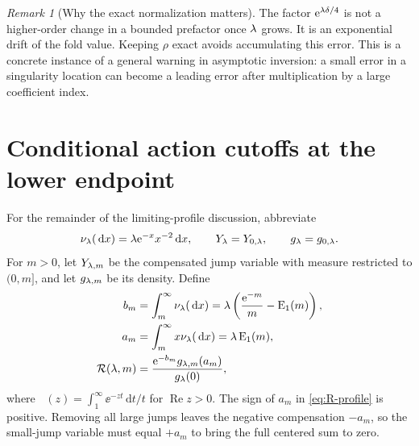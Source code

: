 \documentclass[11pt,a4paper]{article}
\numberwithin{equation}{section}
\theoremstyle{definition}
\theoremstyle{remark}
\newtheorem{remark}[theorem]{Remark}
\DeclareMathOperator{\Rea}{Re}
\DeclareMathOperator{\Eone}{E_1}
\newcommand{\dd}{\,\mathrm d}\newcommand{\ii}{\mathrm i}
\begin{document}
\begin{remark}[Why the exact normalization matters]
The factor \(\mathrm e^{\lambda\delta/4}\) is not a higher-order change in a bounded
prefactor once \(\lambda\) grows. It is an exponential drift of the fold
value. Keeping \(\rho\) exact avoids accumulating this error. This is a
concrete instance of a general warning in asymptotic inversion: a small
error in a singularity location can become a leading error after
multiplication by a large coefficient index.
\end{remark}

\section{Conditional action cutoffs at the lower endpoint}
\label{sec:cutoff}
For the remainder of the limiting-profile discussion, abbreviate
\[
 \nu_\la(\dd x)=\la\ee^{-x}x^{-2}\dd x,\qquad
 Y_\la=Y_{0,\la},\qquad g_\la=g_{0,\la}.
\]
For \(m>0\), let \(Y_{\lambda,m}\) be the compensated jump variable with
measure restricted to \((0,m]\), and let \(g_{\lambda,m}\) be its density.
Define
\begin{align}
 b_m&=\int_m^\infty\nu_\la(\dd x)
       =\la\left(\frac{\ee^{-m}}m-\Eone(m)\right),\label{eq:b}\\
 a_m&=\int_m^\infty x\nu_\la(\dd x)=\la\Eone(m),\label{eq:a}\\
 \RR(\la,m)&=\frac{\ee^{-b_m}g_{\la,m}(a_m)}{g_\la(0)},
 \label{eq:R-profile}
\end{align}
where \(\Eone(z)=\int_1^\infty\ee^{-zt}\dd t/t\) for \(\Rea z>0\).
The sign of \(a_m\) in \eqref{eq:R-profile} is positive. Removing all
large jumps leaves the negative compensation \(-a_m\), so the small-jump
variable must equal \(+a_m\) to bring the full centered sum to zero.
\end{document}
